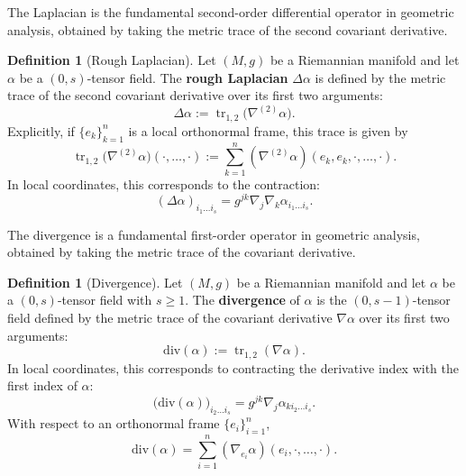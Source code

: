 \documentclass[11pt]{article}
\theoremstyle{plain}
\theoremstyle{definition}
\newtheorem{definition}[theorem]{Definition}
\theoremstyle{remark}
\newcommand{\vspacesub}{\vspace{0pt}}
\begin{document}
\vspacesub 

The Laplacian is the fundamental second-order differential operator in
geometric analysis, obtained by taking the metric trace of the second
covariant derivative.

\begin{definition}[Rough Laplacian]
\label{def:rough_laplacian}
    Let $(M, g)$ be a Riemannian manifold and let $\alpha$ be a $(0,s)$-tensor field.
    The \textbf{rough Laplacian} $\Delta \alpha$ is defined by the metric trace of the second covariant derivative over its first two arguments:
    \begin{equation}
        \Delta \alpha := \operatorname{tr}_{1,2} \big( \nabla^{(2)} \alpha \big).
    \end{equation}
    Explicitly, if $\{e_k\}_{k=1}^n$ is a local orthonormal frame, this trace is given by
    \begin{equation}
        \operatorname{tr}_{1,2} \big( \nabla^{(2)} \alpha \big) (\cdot, \dots, \cdot) := \sum_{k=1}^n (\nabla^{(2)} \alpha)(e_k, e_k, \cdot, \dots, \cdot).
    \end{equation}
    In local coordinates, this corresponds to the contraction:
    \begin{equation}
        (\Delta \alpha)_{i_1 \dots i_s} = g^{jk} \nabla_j \nabla_k \alpha_{i_1 \dots i_s}.
    \end{equation}
\end{definition}

The divergence is a fundamental first-order operator in geometric
analysis, obtained by taking the metric trace of the covariant derivative.


\begin{definition}[Divergence]
\label{def:divergence}
    Let $(M, g)$ be a Riemannian manifold and let $\alpha$ be a $(0,s)$-tensor field with $s \ge 1$.
    The \textbf{divergence} of $\alpha$ is the $(0,s-1)$-tensor field defined by the metric trace of the covariant derivative $\nabla \alpha$ over its first two arguments:
    \begin{equation}
        \mathrm{div}(\alpha) := \operatorname{tr}_{1,2} (\nabla \alpha).
    \end{equation}
    In local coordinates, this corresponds to contracting the derivative index with the first index of $\alpha$:
    \begin{equation}
        \big(\mathrm{div}(\alpha) \big)_{i_2 \dots i_s} = g^{jk} \nabla_j \alpha_{k i_2 \dots i_s}.
    \end{equation}
With respect to an orthonormal frame $\{e_i\}_{i=1}^n$,
\begin{equation}
  \mathrm{div}(\alpha) = \sum_{i=1}^n (\nabla_{e_i} \alpha ) (e_i,\cdot,\ldots,\cdot) .  
\end{equation}
\end{definition}
\end{document}
